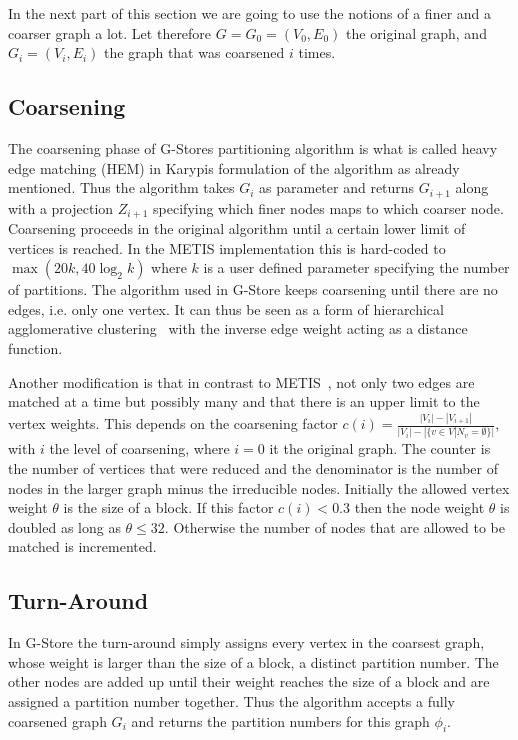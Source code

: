     
    In the next part of this section we are going to use the notions of a finer and a coarser graph a lot. Let therefore $G = G_0 = (V_0, E_0)$ the original graph, and $G_i = (V_i, E_i)$ the graph that was coarsened $i$ times.
    
    \subsection*{Coarsening}
    The coarsening phase of G-Stores partitioning algorithm is what is called heavy edge matching (HEM) in Karypis formulation of the algorithm as already mentioned. 
    Thus the algorithm takes $G_i$ as parameter and returns $G_{i+1}$ along with a projection $Z_{i+1}$ specifying which finer nodes maps to which coarser node.
    Coarsening proceeds in the original algorithm until a certain lower limit of vertices is reached.
    In the METIS implementation this is hard-coded to  $\max \left( 20k, 40 \log_2 k\right)$ where $k$ is a user defined parameter specifying the number of partitions.
    The algorithm used in G-Store keeps coarsening until there are no edges, i.e. only one vertex.
    It can thus be seen as a form of hierarchical agglomerative clustering~\autocite{hac} with the inverse edge weight acting as a distance function.
    
    Another modification is that in contrast to METIS~\autocite{karypis}, not only two edges are matched at a time but possibly many and that there is an upper limit to the vertex weights. 
    This depends on the coarsening factor $c(i) = \frac{|V_i| - |V_{i+1}|}{|V_i| - |\{v \in V | N_v = \emptyset \}|}$, with $i$ the level of coarsening, where $i=0$ it the original graph.
    The counter is the number of vertices that were reduced and the denominator is the number of nodes in the larger graph minus the irreducible nodes.
    Initially the allowed vertex weight $\theta$ is the size of a block.
    If this factor $c(i) < 0.3$ then the node weight $\theta$ is doubled as long as $\theta \leq 32$.
    Otherwise the number of nodes that are allowed to be matched is incremented.
        
    \subsection*{Turn-Around}
    In G-Store the turn-around simply assigns every vertex in the coarsest graph, whose weight is larger than the size of a block, a distinct partition number.
    The other nodes are added up until their weight reaches the size of a block and are assigned a partition number together.
    Thus the algorithm accepts a fully coarsened graph $G_i$ and returns the partition numbers for this graph $\phi_i$.
    
